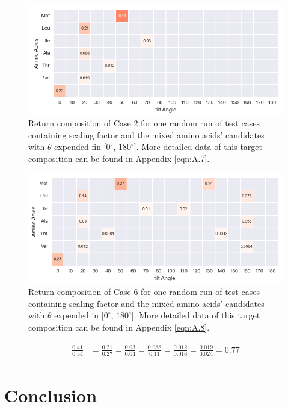 \begin{figure}[!ht] 
\centering
\includegraphics[scale=0.7]{Figures/chapter6_figure_three.png}
\caption{Return composition of Case 2 for one random run of test cases containing scaling factor and the mixed amino acids' candidates with $\theta$ expended fin $[0^{\circ}$, $180^{\circ}]$. More detailed data of this target composition can be found in Appendix \ref{eqn:A.7}.} \label{fig:6.5}
\end{figure}

\begin{figure}[!ht] 
\centering
\includegraphics[scale=0.7]{Figures/chapter6_figure_four.png}
\caption{Return composition of Case 6 for one random run of test cases containing scaling factor and the mixed amino acids' candidates with $\theta$ expended in $[0^{\circ}$, $180^{\circ}]$. More detailed data of this target composition can be found in Appendix \ref{eqn:A.8}.} \label{fig:6.6}
\end{figure}

\begin{eqnarray} 
\begin{split}
\frac{0.41}{0.54} &= \frac{0.21}{0.27} = \frac{0.03}{0.04}  =\frac{0.088}{0.11} = \frac{0.012}{0.016} = \frac{0.019}{0.024} = 0.77
\end{split}\label{eqn:6.2}
\end{eqnarray}

\section{Conclusion}

